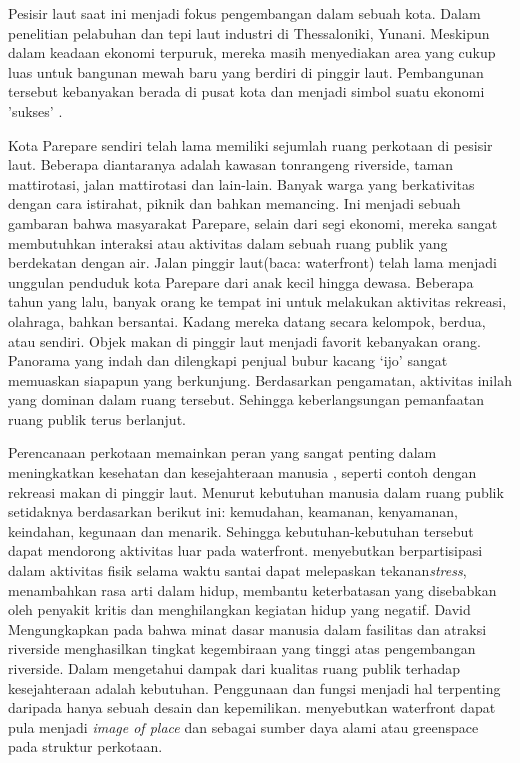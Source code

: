 \documentclass[../thesis.tex]{subfiles}
\begin{document}
Pesisir laut saat ini menjadi fokus pengembangan dalam sebuah kota. Dalam penelitian pelabuhan dan tepi laut industri di Thessaloniki, Yunani. Meskipun dalam keadaan ekonomi terpuruk, mereka masih menyediakan area yang cukup luas untuk bangunan mewah baru yang berdiri di pinggir laut. Pembangunan tersebut kebanyakan berada di pusat kota dan menjadi simbol suatu ekonomi 'sukses' \citep{vayona2011}.

Kota Parepare sendiri telah lama memiliki sejumlah ruang perkotaan di pesisir laut. Beberapa diantaranya adalah kawasan tonrangeng riverside, taman mattirotasi, jalan mattirotasi dan lain-lain. Banyak warga yang berkativitas dengan cara istirahat, piknik dan bahkan memancing. Ini menjadi sebuah gambaran bahwa masyarakat Parepare, selain dari segi ekonomi, mereka sangat membutuhkan interaksi atau aktivitas dalam sebuah ruang publik yang berdekatan dengan air.
Jalan pinggir laut(baca: waterfront) telah lama menjadi unggulan penduduk kota Parepare dari anak kecil hingga dewasa. Beberapa tahun yang lalu, banyak orang ke tempat ini untuk melakukan aktivitas rekreasi, olahraga, bahkan bersantai. Kadang mereka datang secara kelompok, berdua, atau sendiri.
Objek makan di pinggir laut menjadi favorit kebanyakan orang. Panorama yang indah dan dilengkapi penjual bubur kacang `ijo' sangat memuaskan siapapun yang berkunjung. Berdasarkan pengamatan, aktivitas inilah yang dominan dalam ruang tersebut. Sehingga keberlangsungan pemanfaatan ruang publik terus berlanjut.

Perencanaan perkotaan memainkan peran yang sangat penting dalam meningkatkan kesehatan dan kesejahteraan manusia \citep{sarkar2017urban}, seperti contoh dengan rekreasi makan di pinggir laut. Menurut \cite{eckstutassociates1986} kebutuhan manusia dalam ruang publik setidaknya berdasarkan berikut ini: kemudahan, keamanan, kenyamanan, keindahan, kegunaan dan menarik. Sehingga kebutuhan-kebutuhan tersebut dapat mendorong aktivitas luar pada waterfront.
\cite{vancauwenberg2018} menyebutkan berpartisipasi dalam aktivitas fisik selama waktu santai dapat melepaskan tekanan\textit{stress}, menambahkan rasa arti dalam hidup, membantu keterbatasan yang disebabkan oleh penyakit kritis dan menghilangkan kegiatan hidup yang negatif. David Mengungkapkan pada \citep{richarda.lehmann1966} bahwa minat dasar manusia dalam fasilitas dan atraksi riverside  menghasilkan tingkat kegembiraan yang tinggi atas pengembangan riverside.
Dalam \citep{adams2013} mengetahui dampak dari kualitas ruang publik terhadap kesejahteraan adalah kebutuhan. Penggunaan dan fungsi menjadi hal terpenting daripada hanya sebuah desain dan kepemilikan. \cite{sairinen2006} menyebutkan waterfront dapat pula menjadi \textit{image of place} dan sebagai sumber daya alami atau greenspace pada struktur perkotaan.
\end{document}

